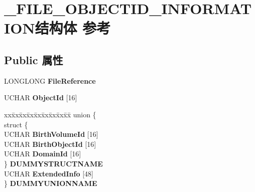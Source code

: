 \hypertarget{struct___f_i_l_e___o_b_j_e_c_t_i_d___i_n_f_o_r_m_a_t_i_o_n}{}\section{\+\_\+\+F\+I\+L\+E\+\_\+\+O\+B\+J\+E\+C\+T\+I\+D\+\_\+\+I\+N\+F\+O\+R\+M\+A\+T\+I\+O\+N结构体 参考}
\label{struct___f_i_l_e___o_b_j_e_c_t_i_d___i_n_f_o_r_m_a_t_i_o_n}
\subsection*{Public 属性}
\begin{DoxyCompactItemize}
\item 
\mbox{\label{struct___f_i_l_e___o_b_j_e_c_t_i_d___i_n_f_o_r_m_a_t_i_o_n_af23c308d27233cd979d3fb032e0fa90a}} 
L\+O\+N\+G\+L\+O\+NG {\bfseries File\+Reference}
\item 
\mbox{\label{struct___f_i_l_e___o_b_j_e_c_t_i_d___i_n_f_o_r_m_a_t_i_o_n_a36577e08b4ebb2d3a118dacfd025976b}} 
U\+C\+H\+AR {\bfseries Object\+Id} \mbox{[}16\mbox{]}
\item 
\mbox{\label{struct___f_i_l_e___o_b_j_e_c_t_i_d___i_n_f_o_r_m_a_t_i_o_n_ad7925af5107afc253cdeb2f49a0711e3}} 
\begin{tabbing}
xx\=xx\=xx\=xx\=xx\=xx\=xx\=xx\=xx\=\kill
union \{\\
\>struct \{\\
\>\>UCHAR {\bfseries BirthVolumeId} \mbox{[}16\mbox{]}\\
\>\>UCHAR {\bfseries BirthObjectId} \mbox{[}16\mbox{]}\\
\>\>UCHAR {\bfseries DomainId} \mbox{[}16\mbox{]}\\
\>\} {\bfseries DUMMYSTRUCTNAME}\\
\>UCHAR {\bfseries ExtendedInfo} \mbox{[}48\mbox{]}\\
\} {\bfseries DUMMYUNIONNAME}\\


\end{tabbing}
\end{DoxyCompactItemize}
